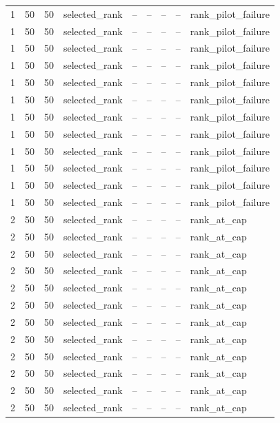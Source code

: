 \begin{longtable}{lllllllll}
1 & 50 & 50 & selected\_rank & -- & -- & -- & -- & rank\_pilot\_failure \\
1 & 50 & 50 & selected\_rank & -- & -- & -- & -- & rank\_pilot\_failure \\
1 & 50 & 50 & selected\_rank & -- & -- & -- & -- & rank\_pilot\_failure \\
1 & 50 & 50 & selected\_rank & -- & -- & -- & -- & rank\_pilot\_failure \\
1 & 50 & 50 & selected\_rank & -- & -- & -- & -- & rank\_pilot\_failure \\
1 & 50 & 50 & selected\_rank & -- & -- & -- & -- & rank\_pilot\_failure \\
1 & 50 & 50 & selected\_rank & -- & -- & -- & -- & rank\_pilot\_failure \\
1 & 50 & 50 & selected\_rank & -- & -- & -- & -- & rank\_pilot\_failure \\
1 & 50 & 50 & selected\_rank & -- & -- & -- & -- & rank\_pilot\_failure \\
1 & 50 & 50 & selected\_rank & -- & -- & -- & -- & rank\_pilot\_failure \\
1 & 50 & 50 & selected\_rank & -- & -- & -- & -- & rank\_pilot\_failure \\
1 & 50 & 50 & selected\_rank & -- & -- & -- & -- & rank\_pilot\_failure \\
2 & 50 & 50 & selected\_rank & -- & -- & -- & -- & rank\_at\_cap \\
2 & 50 & 50 & selected\_rank & -- & -- & -- & -- & rank\_at\_cap \\
2 & 50 & 50 & selected\_rank & -- & -- & -- & -- & rank\_at\_cap \\
2 & 50 & 50 & selected\_rank & -- & -- & -- & -- & rank\_at\_cap \\
2 & 50 & 50 & selected\_rank & -- & -- & -- & -- & rank\_at\_cap \\
2 & 50 & 50 & selected\_rank & -- & -- & -- & -- & rank\_at\_cap \\
2 & 50 & 50 & selected\_rank & -- & -- & -- & -- & rank\_at\_cap \\
2 & 50 & 50 & selected\_rank & -- & -- & -- & -- & rank\_at\_cap \\
2 & 50 & 50 & selected\_rank & -- & -- & -- & -- & rank\_at\_cap \\
2 & 50 & 50 & selected\_rank & -- & -- & -- & -- & rank\_at\_cap \\
2 & 50 & 50 & selected\_rank & -- & -- & -- & -- & rank\_at\_cap \\
2 & 50 & 50 & selected\_rank & -- & -- & -- & -- & rank\_at\_cap \\

\end{longtable}
